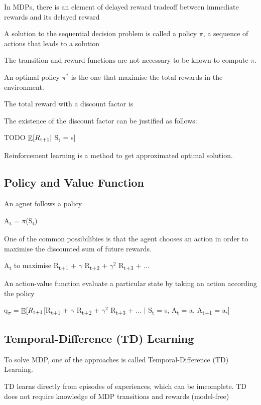 \documentclass[12pt,twoside]{report}
\DeclareMathOperator{\E}{\mathbb{E}}
\begin{document}
In MDPs, there is an element of delayed reward tradeoff between immediate rewards and its delayed reward

A solution to the sequential decision problem is called a policy $\pi$, a sequence of actions that leads to a solution

The transition and reward functions are not necessary to be known to compute $\pi$.

An optimal policy $\pi^*$ is the one that maximise the total rewards in the environment.

The total reward with a discount factor is

The existence of the discount factor can be justified as follows:

TODO
$\displaystyle \E[R\textsubscript{t+1} \vert$ S\textsubscript{t} = s]

Reinforcement learning is a method to get approximated optimal solution.

\subsection{Policy and Value Function}

An agnet follows a policy

A\textsubscript{t} = $\pi$(S\textsubscript{t})

One of the common possibilibies is that the agent chooses an action in order to maximise the discounted sum of future rewards. 

A\textsubscript{t} to maximise R\textsubscript{t+1} + $\gamma$ R\textsubscript{t+2} + $\gamma^2$ R\textsubscript{t+3} + ...


An action-value function evaluate a particular state by taking an action according the policy 

q\textsubscript{$\pi$} = $\displaystyle \E[R\textsubscript{t+1} $[R\textsubscript{t+1} + $\gamma$ R\textsubscript{t+2} + $\gamma^2$ R\textsubscript{t+3} + ... $\vert$ S\textsubscript{t} = s, A\textsubscript{t} = a, A\textsubscript{t+1 } = a,]




\subsection{Temporal-Difference (TD) Learning}

To solve MDP, one of the approaches is called Temporal-Difference (TD) Learning.

TD learns directly from episodes of experiences, which can be imcomplete.
TD does not require knowledge of MDP transitions and rewards (model-free)
\end{document}
